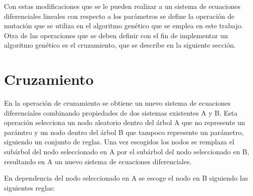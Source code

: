 
Con estas modificaciones que se le pueden realizar a un sistema de ecuaciones diferenciales lineales con respecto a los parámetros se define la operación de mutación que se utiliza en el algoritmo genético que se emplea en este trabajo. Otra de las operaciones que se deben definir con el fin de implementar un algoritmo genético es el cruzamiento, que se describe en la siguiente sección.

\section{Cruzamiento}\label{section:xcross}

En la operación de cruzamiento se obtiene un nuevo sistema de ecuaciones diferenciales combinando propiedades de dos sistemas existentes A y B. Esta operación selecciona un nodo aleatorio dentro del árbol A que no represente un parámtro y un nodo dentro del árbol B que tampoco represente un parámetro, siguiendo un conjunto de reglas. Una vez escogidos los nodos se remplaza el subárbol del nodo seleccionado en A por el subárbol del nodo seleccionado en B, resultando en A un nuevo sistema de ecuaciones diferenciales.

En dependencia del nodo seleccionado en A se escoge el nodo en B siguiendo las siguientes reglas:



